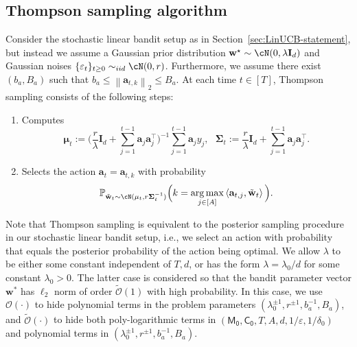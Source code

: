 \documentclass[10pt]{article}
\newcommand{\id}{\bI}
\newcommand{\eps}{\varepsilon}
\DeclareMathOperator*{\argmax}{arg\,max}
\newcommand{\norm}[1]{\left\|{#1}\right\|}
\newcommand{\ltwo}[1]{\norm{#1}_2}
\renewcommand{\cO}{\mathcal{O}}
\newcommand{\<}{\left\langle}
\renewcommand{\>}{\right\rangle}
\renewcommand{\P}{\mathbb{P}}
\newcommand{\Tpsmean}{{{\mathbf\mu}}}
\newcommand{\Tpscov}{{{\mathbf\Sigma}}}
\newcommand{\Tpssam}{{\tilde\bw}}
\newcommand{\Tpspar}{{\lambda}}
\newcommand{\Tpsparn}{{r}}
\newcommand{\tcO}{{\tilde{\mathcal O}}}
\newcommand{\totlen}{{T}}
\newcommand{\neuron}{{\mathsf{M_0}}}
\newcommand{\weightn}{{{\mathsf{C_0}}}}
\def\bI{{\mathbf I}}
\def\ba{{\mathbf a}}
\def\bw{{\mathbf w}}
\begin{document}
\subsection{Thompson sampling algorithm}\label{app:ts_algorithm_formula}
Consider the stochastic linear bandit setup as in Section~\ref{sec:LinUCB-statement}, but instead we assume a  Gaussian prior distribution $\bw^\star\sim \cN(0,\Tpspar\id_d)$ and Gaussian noises $\{ \eps_t \}_{t \ge 0} \sim_{iid} \cN(0,\Tpsparn)$. Furthermore, we assume there exist $(b_a, B_a)$ such that $b_a\leq\ltwo{\ba_{t,k}}\leq B_a$. At each time $t\in[\totlen]$, Thompson sampling consists of the following steps:
\begin{enumerate}
    \item Computes
    \[
    \Tpsmean_t:= \Big(\frac{\Tpsparn}{\Tpspar  }\id_{d}+\sum_{j=1}^{t-1}\ba_j\ba_j^\top \Big)^{-1}\sum_{j=1}^{t-1}\ba_j y_j,~~~
\Tpscov_t:=\frac{\Tpsparn}{\Tpspar  }\id_{d}+\sum_{j=1}^{t-1}\ba_j\ba_j^\top.
\]
\item Selects the action $\ba_{t}=\ba_{t,k}$ with probability
\[
\P_{\Tpssam_t\sim\cN(\Tpsmean_t,\Tpsparn\Tpscov_t^{-1})}\Big(k =\argmax_{j \in[A]}\<\ba_{t,j},\Tpssam_t\> \Big).
\]
\end{enumerate}
Note that Thompson sampling is equivalent to the posterior sampling procedure in our stochastic linear bandit setup, i.e., we select an action with probability that equals  the posterior probability of the action being optimal.  We allow $\Tpspar$ to be either some constant independent of $\totlen,d$,  or has the form $\Tpspar=\Tpspar_0/d$ for some constant $\Tpspar_0>0$.  The latter case is considered so that the bandit parameter vector $\bw^*$ has $\ell_2$ norm of order  $\tcO(1)$ with high probability. In this case, we use $\cO(\cdot)$ to hide polynomial terms in the problem parameters $(\lambda_0^{\pm1},\Tpsparn^{\pm1},b_a^{-1},B_a)$, and $\tcO(\cdot)$ to hide both poly-logarithmic terms in $(\neuron,\weightn,T,A,d,1/\eps,1/\delta_0)$ and polynomial terms in  $(\lambda_0^{\pm1},\Tpsparn^{\pm1},b_a^{-1},B_a)$.
\end{document}
